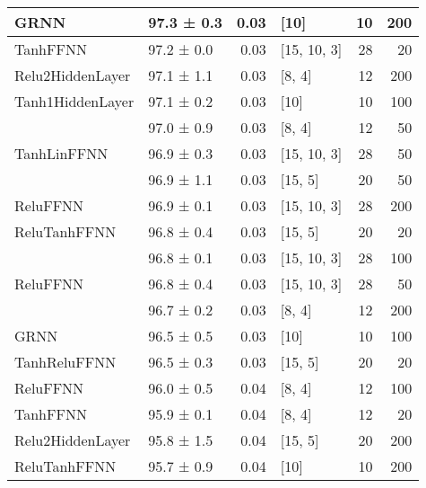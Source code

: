 \begin{longtable}{llrlrr}
 \hline
GRNN                                & 97.3 ± 0.3  &  0.03 & [10]           &         10 &      200 \\
 \hline
TanhFFNN                            & 97.2 ± 0.0  &  0.03 & [15, 10, 3]    &         28 &       20 \\
 \hline
Relu2HiddenLayer                    & 97.1 ± 1.1  &  0.03 & [8, 4]         &         12 &      200 \\
 \hline
Tanh1HiddenLayer                    & 97.1 ± 0.2  &  0.03 & [10]           &         10 &      100 \\
 \hline
\multirow{3}{*}{TanhLinFFNN}        & 97.0 ± 0.9  &  0.03 & [8, 4]         &         12 &       50 \\
                                            & 96.9 ± 0.3  &  0.03 & [15, 10, 3]    &         28 &       50 \\
                                            & 96.9 ± 1.1  &  0.03 & [15, 5]        &         20 &       50 \\
 \hline
ReluFFNN                            & 96.9 ± 0.1  &  0.03 & [15, 10, 3]    &         28 &      200 \\
 \hline
ReluTanhFFNN                        & 96.8 ± 0.4  &  0.03 & [15, 5]        &         20 &       20 \\
 \hline
\multirow{3}{*}{ReluFFNN}           & 96.8 ± 0.1  &  0.03 & [15, 10, 3]    &         28 &      100 \\
                                            & 96.8 ± 0.4  &  0.03 & [15, 10, 3]    &         28 &       50 \\
                                            & 96.7 ± 0.2  &  0.03 & [8, 4]         &         12 &      200 \\
 \hline
GRNN                                & 96.5 ± 0.5  &  0.03 & [10]           &         10 &      100 \\
 \hline
TanhReluFFNN                        & 96.5 ± 0.3  &  0.03 & [15, 5]        &         20 &       20 \\
 \hline
ReluFFNN                            & 96.0 ± 0.5  &  0.04 & [8, 4]         &         12 &      100 \\
 \hline
TanhFFNN                            & 95.9 ± 0.1  &  0.04 & [8, 4]         &         12 &       20 \\
 \hline
Relu2HiddenLayer                    & 95.8 ± 1.5  &  0.04 & [15, 5]        &         20 &      200 \\
 \hline
ReluTanhFFNN                        & 95.7 ± 0.9  &  0.04 & [10]           &         10 &      200 \\

\end{longtable}
